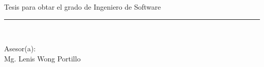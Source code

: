 \begin{titlepage}
\begin{center}
    \vspace*{0.3in}
    \begin{large}
        Tesis para obtar el grado de Ingeniero de Software\\
    \end{large}
    \vspace*{0.4in}
    \rule{80mm}{0.1mm}\\
    \vspace*{0.1in}
    \begin{large}
        Asesor(a): \\
        Mg. Lenis Wong Portillo \\
    \end{large}
\end{center}

\end{titlepage}
